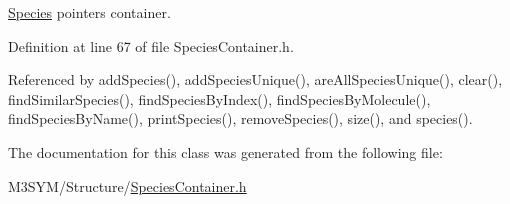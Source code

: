 \hyperlink{classSpecies}{Species} pointers container. 



Definition at line 67 of file Species\+Container.\+h.



Referenced by add\+Species(), add\+Species\+Unique(), are\+All\+Species\+Unique(), clear(), find\+Similar\+Species(), find\+Species\+By\+Index(), find\+Species\+By\+Molecule(), find\+Species\+By\+Name(), print\+Species(), remove\+Species(), size(), and species().



The documentation for this class was generated from the following file\+:\begin{DoxyCompactItemize}
\item 
M3\+S\+Y\+M/\+Structure/\hyperlink{SpeciesContainer_8h}{Species\+Container.\+h}\end{DoxyCompactItemize}
